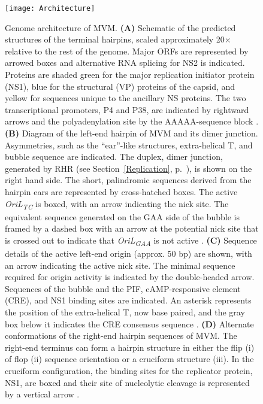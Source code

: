 \begin{figure}
\centering
  \texttt{[image: Architecture]}
  \caption[Genome architecture of MVM]
   {Genome architecture of MVM. \textbf{(A)} Schematic of the predicted structures of the terminal hairpins, scaled approximately 20$\times$ relative to the rest of the genome. Major ORFs are represented by arrowed boxes and alternative RNA splicing for NS2 is indicated. Proteins are shaded green for the major replication initiator protein (NS1), blue for the structural (VP) proteins of the capsid, and yellow for sequences unique to the ancillary NS proteins. The two transcriptional promoters, P4 and P38, are indicated by rightward arrows and the polyadenylation site by the AAAAA-sequence block \cite{small}. \textbf{(B)} Diagram of the left-end hairpin of MVM and its dimer junction. Asymmetries, such as the ``ear''-like structures, extra-helical T, and bubble sequence are indicated. The duplex, dimer junction, generated by RHR (see Section~\ref{Replication}, p.~\pageref{Replication}), is shown on the right hand side. The short, palindromic sequences derived from the hairpin ears are represented by cross-hatched boxes. The active \textit{OriL\textsubscript{TC}} is boxed, with an arrow indicating the nick site. The equivalent sequence generated on the GAA side of the bubble is framed by a dashed box with an arrow at the potential nick site that is crossed out to indicate that \textit{OriL\textsubscript{GAA}} is not active \cite{pmid12885883, pmid16928767}. \textbf{(C)} Sequence details of the active left-end origin (approx. 50 bp) are shown, with an arrow indicating the active nick site. The minimal sequence required for origin activity is indicated by the double-headed arrow. Sequences of the bubble and the PIF, cAMP-responsive element (CRE), and NS1 binding sites are indicated. An asterisk represents the position of the extra-helical T, now base paired, and the gray box below it indicates the CRE consensus sequence \cite{pmid12885883}. \textbf{(D)} Alternate conformations of the right-end hairpin sequences of MVM. The right-end terminus can form a hairpin structure in either the flip (i) of flop (ii) sequence orientation or a cruciform structure (iii). In the cruciform configuration, the binding sites for the replicator protein, NS1, are boxed and their site of nucleolytic cleavage is represented by a vertical arrow \cite{pmid8614999}.
} 
\label{Architecture}
\end{figure}


